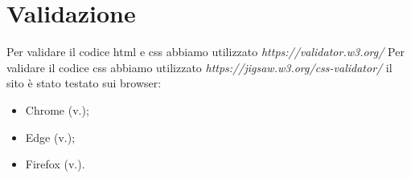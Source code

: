 \section{Validazione}
Per validare il codice html e css abbiamo utilizzato \emph{https://validator.w3.org/} \newline
Per validare il codice css abbiamo utilizzato \emph{https://jigsaw.w3.org/css-validator/} \newline
il sito è stato testato sui browser:
\begin{itemize}
    \item Chrome (v.);
    \item Edge (v.);
    \item Firefox (v.).	
\end{itemize}